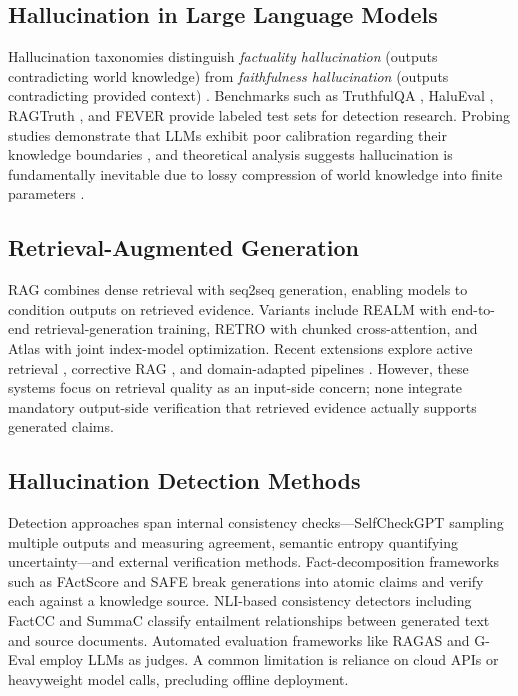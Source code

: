 \documentclass[conference]{IEEEtran}
\begin{document}
\subsection{Hallucination in Large Language Models}

Hallucination taxonomies distinguish \emph{factuality hallucination} (outputs contradicting world knowledge) from \emph{faithfulness hallucination} (outputs contradicting provided context) \cite{ji2023survey,huang2025survey}. Benchmarks such as TruthfulQA \cite{lin2022truthfulqa}, HaluEval \cite{li2023halueval}, RAGTruth \cite{niu2024ragtruth}, and FEVER \cite{thorne2018fever} provide labeled test sets for detection research. Probing studies demonstrate that LLMs exhibit poor calibration regarding their knowledge boundaries \cite{mallen2023trust}, and theoretical analysis suggests hallucination is fundamentally inevitable due to lossy compression of world knowledge into finite parameters \cite{xu2024inevitable}.

\subsection{Retrieval-Augmented Generation}

RAG \cite{lewis2020rag} combines dense retrieval with seq2seq generation, enabling models to condition outputs on retrieved evidence. Variants include REALM \cite{guu2020realm} with end-to-end retrieval-generation training, RETRO \cite{borgeaud2022retro} with chunked cross-attention, and Atlas \cite{izacard2022atlas} with joint index-model optimization. Recent extensions explore active retrieval \cite{jiang2023flare}, corrective RAG \cite{yan2024crag}, and domain-adapted pipelines \cite{krainovskikh2026domain}. However, these systems focus on retrieval quality as an input-side concern; none integrate mandatory output-side verification that retrieved evidence actually supports generated claims.

\subsection{Hallucination Detection Methods}

Detection approaches span internal consistency checks—SelfCheckGPT \cite{manakul2023selfcheckgpt} sampling multiple outputs and measuring agreement, semantic entropy \cite{farquhar2024semantic} quantifying uncertainty—and external verification methods. Fact-decomposition frameworks such as FActScore \cite{min2023factscore} and SAFE \cite{wei2024longform} break generations into atomic claims and verify each against a knowledge source. NLI-based consistency detectors including FactCC \cite{kryscinski2020factcc} and SummaC \cite{laban2022summac} classify entailment relationships between generated text and source documents. Automated evaluation frameworks like RAGAS \cite{es2024ragas} and G-Eval \cite{liu2023geval} employ LLMs as judges. A common limitation is reliance on cloud APIs or heavyweight model calls, precluding offline deployment.
\end{document}
